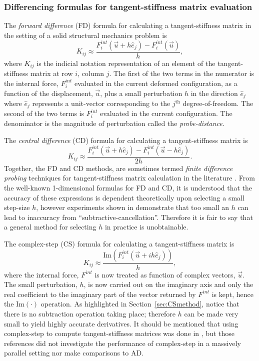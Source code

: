 \documentclass[preprint,12pt]{elsarticle}
\begin{document}
\subsubsection{Differencing formulas for tangent-stiffness matrix evaluation}

The \emph{forward difference} (FD) formula for calculating a tangent-stiffness matrix in the setting of a solid structural mechanics problem is 
%
\begin{equation} 
  K_{ij} \approx \frac{F_i^{int}(\vec{u} + h \hat{e}_j) - F_i^{int}(\vec{u})}{h},
\end{equation}
%
where $K_{ij}$ is the indicial notation representation of an element of the tangent-stiffness matrix at row $i$, column $j$. The first of the two terms in the numerator is the internal force, $F_i^{int}$ evaluated in the current deformed configuration, as a function of the displacement, $\vec{u}$,  plus a small perturbation $h$ in the direction $\hat{e}_j$ where $\hat{e}_j$ represents a unit-vector corresponding to the $j^{\mbox{th}}$ degree-of-freedom. The second of the two terms is $F_i^{int}$ evaluated in the current configuration. The denominator is the
magnitude of perturbation called the \emph{probe-distance}.

The \emph{central difference} (CD) formula for calculating a tangent-stiffness matrix is
%
\begin{equation} 
  K_{ij} \approx \frac{F_i^{int}(\vec{u} + h \hat{e}_j) - F_i^{int}(\vec{u} - h \hat{e}_j)}{2 h}.
\end{equation}
%
Together, the FD and CD methods, are sometimes termed \emph{finite difference probing} techniques for tangent-stiffness matrix calculation in the literature \cite{ref-Adaggio}. From the well-known 1-dimensional formulas for FD and CD, it is understood that the accuracy of these expressions is dependent theoretically upon selecting a small step-size $h$, however experiments shown in \cite{squire1998using} demonstrate that too small an $h$ can lead to inaccuracy from ``subtractive-cancellation''. Therefore it is fair to say that a general method for selecting $h$ in practice is unobtainable.

The complex-step (CS) formula for calculating a tangent-stiffness matrix is
%
\begin{equation} K_{ij} \approx \frac{\mbox{Im}(F_i^{int}(\vec{u} + i h
\hat{e}_j))}{h}, \end{equation}
%
where the internal force, $F^{int}$ is now treated as function of complex vectors,  $\vec{u}$. The small perturbation, $h$, is now carried out on the imaginary axis and only the real coefficient to the imaginary part of the vector returned by $F^{int}$ is kept, hence the $\mbox{Im}(\cdot)$ operation.  As highlighted in Section~\ref{sec:CSmethod}, notice that there is no subtraction operation taking place; therefore $h$ can be made very small to yield highly accurate derivatives. It should be mentioned that using complex-step to compute tangent-stiffness matrices was done in \cite{perez2000numerical,perez2012numerical}, but those references did not
investigate the performance of complex-step in a massively parallel setting nor make comparisons to AD. 
\end{document}
